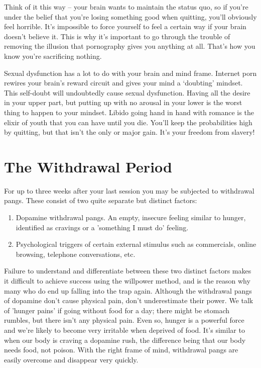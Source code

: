 \documentclass[
]{book}
\begin{document}
Think of it this way -- your brain wants to maintain the status quo, so if you're under the belief that you're losing something good when quitting, you'll obviously feel horrible. It's impossible to force yourself to feel a certain way if your brain doesn't believe it. This is why it's important to go through the trouble of removing the illusion that pornography gives you anything at all. That's how you know you're sacrificing nothing.

Sexual dysfunction has a lot to do with your brain and mind frame. Internet porn rewires your brain's reward circuit and gives your mind a `doubting' mindset. This self-doubt will undoubtedly cause sexual dysfunction. Having all the desire in your upper part, but putting up with no arousal in your lower is the worst thing to happen to your mindset. Libido going hand in hand with romance is the elixir of youth that you can have until you die. You'll keep the probabilities high by quitting, but that isn't the only or major gain. It's your freedom from slavery!

\hypertarget{the-withdrawal-period}{%
\chapter{The Withdrawal Period}\label{the-withdrawal-period}}

For up to three weeks after your last session you may be subjected to withdrawal pangs. These consist of two quite separate but distinct factors:

\begin{enumerate}
\def\labelenumi{\arabic{enumi}.}
\item
  Dopamine withdrawal pangs. An empty, insecure feeling similar to hunger, identified as cravings or a 'something I must do' feeling.
\item
  Psychological triggers of certain external stimulus such as commercials, online browsing, telephone conversations, etc.
\end{enumerate}

Failure to understand and differentiate between these two distinct factors makes it difficult to achieve success using the willpower method, and is the reason why many who do end up falling into the trap again. Although the withdrawal pangs of dopamine don't cause physical pain, don't underestimate their power. We talk of 'hunger pains' if going without food for a day; there might be stomach rumbles, but there isn't any physical pain. Even so, hunger is a powerful force and we're likely to become very irritable when deprived of food. It's similar to when our body is craving a dopamine rush, the difference being that our body needs food, not poison. With the right frame of mind, withdrawal pangs are easily overcome and disappear very quickly.
\end{document}
